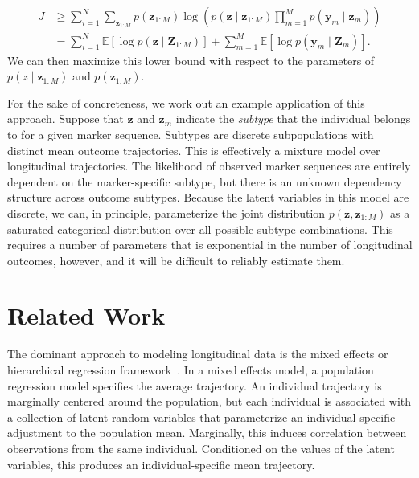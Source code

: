 \documentclass[12pt]{article}
\newcommand{\E}{\mathbb{E}}
\newcommand{\given}{\mid}
\begin{document}
\begin{align}
J &\ge \sum_{i=1}^N \sum_{\bm{z}_{1:M}} p(\bm{z}_{1:M}) \log \left( p(\bm{z} \given \bm{z}_{1:M}) \prod_{m=1}^M p(\bm{y}_m \given \bm{z}_m) \right) \\
	&= \sum_{i=1}^N \E[\log p(\bm{z} \given \bm{Z}_{1:M})] + \sum_{m=1}^M \E[\log p(\bm{y}_m \given \bm{Z}_m)].
\end{align}
We can then maximize this lower bound with respect to the parameters of $p(z \given \bm{z}_{1:M})$ and $p(\bm{z}_{1:M})$.

For the sake of concreteness, we work out an example application of this approach. Suppose that $\bm{z}$ and $\bm{z}_m$ indicate the \emph{subtype} that the individual belongs to for a given marker sequence. Subtypes are discrete subpopulations with distinct mean outcome trajectories. This is effectively a mixture model over longitudinal trajectories. The likelihood of observed marker sequences are entirely dependent on the marker-specific subtype, but there is an unknown dependency structure across outcome subtypes. Because the latent variables in this model are discrete, we can, in principle, parameterize the joint distribution $p(\bm{z}, \bm{z}_{1:M})$ as a saturated categorical distribution over all possible subtype combinations. This requires a number of parameters that is exponential in the number of longitudinal outcomes, however, and it will be difficult to reliably estimate them.

\section{Related Work}

The dominant approach to modeling longitudinal data is the mixed effects or hierarchical regression framework~\cite{Diggle2002-tt}. In a mixed effects model, a population regression model specifies the average trajectory. An individual trajectory is marginally centered around the population, but each individual is associated with a collection of latent random variables that parameterize an individual-specific adjustment to the population mean. Marginally, this induces correlation between observations from the same individual. Conditioned on the values of the latent variables, this produces an individual-specific mean trajectory.
\end{document}
